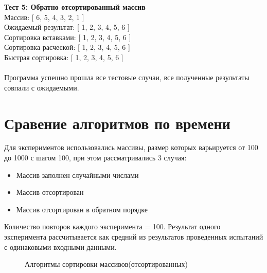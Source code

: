 \documentclass[a4paper,12pt]{report}
\begin{document}
\textbf {Тест 5: Обратно отсортированный массив}\\
Массив: [ 6, 5, 4, 3, 2, 1 ]\\
Ожидаемый результат: [ 1, 2, 3, 4, 5, 6 ]\\
Сортировка вставками: [ 1, 2, 3, 4, 5, 6 ]\\
Сортировка расческой: [ 1, 2, 3, 4, 5, 6 ]\\
Быстрая сортировка: [ 1, 2, 3, 4, 5, 6 ]\\\\

Программа успешно прошла все тестовые случаи, все полученные результаты совпали с ожидаемыми.

\section{Сравение алгоритмов по времени}
\hspace{0.6cm}Для экспериментов использовались массивы, размер которых варьируется от 100 до 1000 с шагом 100, при этом рассматривались 3 случая:
\begin{itemize}
\item Массив заполнен случайными числами
\item Массив отсортирован
\item Массив отсортирован в обратном порядке
\end{itemize}
    Количество повторов каждого эксперимента = 100. Результат одного эксперимента рассчитывается как средний из результатов проведенных испытаний с одинаковыми входными данными.
    

\begin{figure}[ht!]
\begin{center}
\caption{Алгоритмы сортировки массивов(отсортированных)}
\end{center}
\end{figure}
\end{document}
